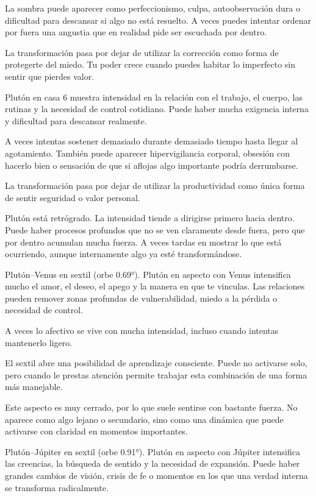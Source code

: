\documentclass[11pt,a4paper]{article}
\begin{document}
La sombra puede aparecer como perfeccionismo, culpa, autoobservación dura o dificultad para descansar si algo no está resuelto. A veces puedes intentar ordenar por fuera una angustia que en realidad pide ser escuchada por dentro.

La transformación pasa por dejar de utilizar la corrección como forma de protegerte del miedo. Tu poder crece cuando puedes habitar lo imperfecto sin sentir que pierdes valor.

Plutón en casa 6 muestra intensidad en la relación con el trabajo, el cuerpo, las rutinas y la necesidad de control cotidiano. Puede haber mucha exigencia interna y dificultad para descansar realmente.

A veces intentas sostener demasiado durante demasiado tiempo hasta llegar al agotamiento. También puede aparecer hipervigilancia corporal, obsesión con hacerlo bien o sensación de que si aflojas algo importante podría derrumbarse.

La transformación pasa por dejar de utilizar la productividad como única forma de sentir seguridad o valor personal.

Plutón está retrógrado. La intensidad tiende a dirigirse primero hacia dentro. Puede haber procesos profundos que no se ven claramente desde fuera, pero que por dentro acumulan mucha fuerza. A veces tardas en mostrar lo que está ocurriendo, aunque internamente algo ya esté transformándose.

Plutón–Venus en sextil (orbe 0.69°).
Plutón en aspecto con Venus intensifica mucho el amor, el deseo, el apego y la manera en que te vinculas. Las relaciones pueden remover zonas profundas de vulnerabilidad, miedo a la pérdida o necesidad de control.

A veces lo afectivo se vive con mucha intensidad, incluso cuando intentas mantenerlo ligero.

El sextil abre una posibilidad de aprendizaje consciente. Puede no activarse solo, pero cuando le prestas atención permite trabajar esta combinación de una forma más manejable.

Este aspecto es muy cerrado, por lo que suele sentirse con bastante fuerza. No aparece como algo lejano o secundario, sino como una dinámica que puede activarse con claridad en momentos importantes.

Plutón–Júpiter en sextil (orbe 0.91°).
Plutón en aspecto con Júpiter intensifica las creencias, la búsqueda de sentido y la necesidad de expansión. Puede haber grandes cambios de visión, crisis de fe o momentos en los que una verdad interna se transforma radicalmente.
\end{document}

